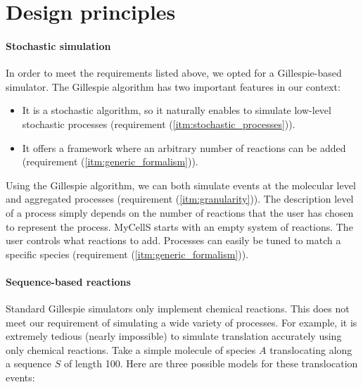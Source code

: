 \section{Design principles}

\paragraph{Stochastic simulation}
In order to meet the requirements listed above,
we opted for a Gillespie-based simulator.
The Gillespie algorithm has two important features in our context:
\begin{itemize}
  \item It is a stochastic algorithm, so it naturally enables to simulate
  low-level stochastic processes (requirement (\ref{itm:stochastic_processes})).
  \item It offers a framework where an arbitrary number of reactions can
  be added (requirement (\ref{itm:generic_formalism})).
\end{itemize}
Using the Gillespie algorithm, we can both simulate events at the molecular
level and aggregated processes (requirement (\ref{itm:granularity})).
The description level of a process simply depends on the number of reactions
that the user has chosen to represent the process.
MyCellS starts with an empty system of reactions.
The user controls what reactions to add.
Processes can easily be tuned to match a specific species
(requirement (\ref{itm:generic_formalism})).

\paragraph{Sequence-based reactions}
Standard Gillespie simulators only implement chemical reactions.
This does not meet our requirement of simulating a wide variety of processes.
For example, it is extremely tedious (nearly impossible) to simulate
translation accurately using only chemical reactions.
Take a simple molecule of species $A$ translocating along a sequence $S$
of length 100.
Here are three possible models for these translocation events:

